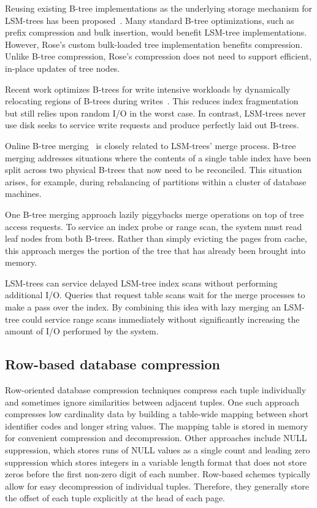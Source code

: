 \documentclass{vldb}
\newcommand{\rowss}{Rose's\xspace}
\newcommand{\xxx}[1]{\textcolor{red}{\bf XXX: #1}}
\renewcommand{\xxx}[1]{\xspace}
\begin{document}
Reusing existing B-tree implementations as
the underlying storage mechanism for LSM-trees has been proposed~\cite{cidrPartitionedBTree}.  Many
standard B-tree optimizations, such as prefix compression and bulk insertion,
would benefit LSM-tree implementations.  However, \rowss custom bulk-loaded tree
implementation benefits compression.  Unlike B-tree compression, \rowss
compression does not need to support
efficient, in-place updates of tree nodes.

Recent work optimizes B-trees for write intensive workloads by dynamically
relocating regions of B-trees during
writes~\cite{bTreeHighUpdateRates}.  This reduces index fragmentation
but still relies upon random I/O in the worst case.  In contrast,
LSM-trees never use disk seeks to service write requests and produce
perfectly laid out B-trees.

Online B-tree merging~\cite{onlineMerging} is closely related to
LSM-trees' merge process.  B-tree merging
addresses situations where the contents of a single table index have
been split across two physical B-trees that now need to be reconciled.
This situation arises, for example, during rebalancing of partitions
within a cluster of database machines.

One B-tree merging approach lazily piggybacks merge
operations on top of tree access requests.  To service an index
probe or range scan, the system must read leaf nodes from both B-trees.
Rather than simply evicting the pages from cache, this approach merges
the portion of the tree that has already been brought into
memory.

LSM-trees can service delayed
LSM-tree index scans without performing additional I/O.  Queries that request table scans wait for
the merge processes to make a pass over the index.
By combining this idea with lazy merging an LSM-tree could service
range scans immediately without significantly increasing the amount of
I/O performed by the system.

\subsection{Row-based database compression}
\xxx{shorten?}
Row-oriented database compression techniques compress each tuple
individually and sometimes ignore similarities between adjacent
tuples.  One such approach compresses low cardinality data by building
a table-wide mapping between short identifier codes and longer string
values. The mapping table is stored in memory for convenient
compression and decompression.  Other approaches include NULL
suppression, which stores runs of NULL values as a single count and
leading zero suppression which stores integers in a variable length
format that does not store zeros before the first non-zero digit of each
number.  Row-based schemes typically allow for easy decompression of
individual tuples.  Therefore, they generally store the offset of each
tuple explicitly at the head of each page.
\end{document}
